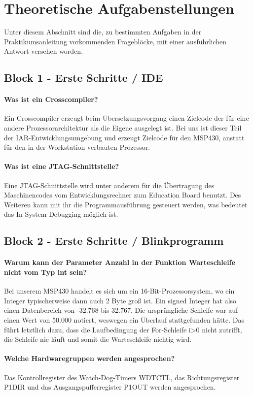 \documentclass[12pt,a4paper,bibliography=totocnumbered,listof=totocnumbered]{scrartcl}
\begin{document}
\section{Theoretische Aufgabenstellungen}
Unter diesem Abschnitt sind die, zu bestimmten Aufgaben in der Praktikumsanleitung vorkommenden Frageblöcke, mit einer ausführlichen Antwort versehen worden.

\subsection{Block 1 - Erste Schritte / IDE}
\paragraph{Was ist ein Crosscompiler?}
Ein Crosscompiler erzeugt beim Übersetzungsvorgang einen Zielcode der für eine andere Prozessorarchitektur als die Eigene ausgelegt ist. Bei uns ist dieser Teil der IAR-Entwicklungsumgebung und erzeugt Zielcode für den MSP430, anstatt für den in der Workstation verbauten Prozessor.
\paragraph{Was ist eine JTAG-Schnittstelle?}
Eine JTAG-Schnittstelle wird unter anderem für die Übertragung des Maschinencodes vom Entwicklungsrechner zum Education Board benutzt. Des Weiteren kann mit ihr die Programmausführung gesteuert werden, was bedeutet das In-System-Debugging möglich ist.

\subsection{Block 2 - Erste Schritte / Blinkprogramm }
\paragraph{Warum kann der Parameter Anzahl in der Funktion Warteschleife nicht vom Typ int sein?}
Bei unserem MSP430 handelt es sich um ein 16-Bit-Prozessorsystem, wo ein Integer typischerweise dann auch 2 Byte groß ist. Ein signed Integer hat also einen Datenbereich von -32.768 bis 32.767. Die ursprüngliche Schleife war auf einen Wert von 50.000 notiert, weswegen ein Überlauf stattgefunden hätte. Das führt letztlich dazu, dass die Laufbedingung der For-Schleife i\textgreater0 nicht zutrifft, die Schleife nie läuft und somit die  Warteschleife nichtig wird.
\paragraph{Welche Hardwaregruppen werden angesprochen?}
Das Kontrollregister des Watch-Dog-Timers WDTCTL, das Richtungsregister P1DIR und das Ausgangspufferregister P1OUT werden angesprochen.
\end{document}

